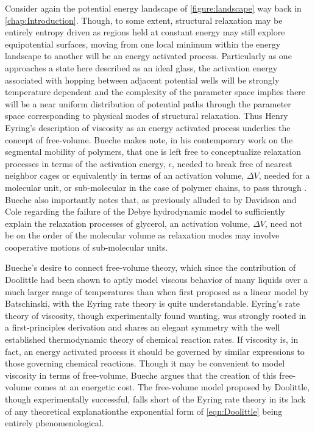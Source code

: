 Consider again the potential energy landscape of \fig \nolinebreak \ref{figure:landscape} way back in \chap\nolinebreak \ref{chap:Introduction}. Though, to some extent, structural relaxation may be entirely entropy driven as regions held at constant energy may still explore equipotential surfaces, moving from one local minimum within the energy landscape to another will be an energy activated process. Particularly as one approaches a state here described as an ideal glass, the activation energy associated with hopping between adjacent potential wells will be strongly temperature dependent and the complexity of the parameter space implies there will be a near uniform distribution of potential paths through the parameter space corresponding to physical modes of structural relaxation.  Thus Henry Eyring's description of viscosity as an energy activated process underlies the concept of free-volume.  Bueche makes note, in his contemporary work on the segmental mobility of polymers, that one is left free to conceptualize relaxation processes in terms of the activation energy, $\epsilon$, needed to break free of nearest neighbor cages or equivalently in terms of an activation volume, $\Delta V$, needed for a molecular unit, or sub-molecular in the case of polymer chains, to pass through \nolinebreak\cite{Bueche}.  Bueche also importantly notes that, as previously alluded to by Davidson and Cole regarding the failure of the Debye hydrodynamic model to sufficiently explain the relaxation processes of glycerol, an activation volume, $\Delta V$, need not be on the order of the molecular volume as relaxation modes may involve cooperative motions of sub-molecular units.  

Bueche's desire to connect free-volume theory, which since the contribution of Doolittle had been shown to aptly model viscous behavior of many liquids over a much larger range of temperatures than when first proposed as a linear model by Batschinski, with the Eyring rate theory is quite understandable.  Eyring's rate theory of viscosity, though experimentally found wanting, was strongly rooted in a first-principles derivation and shares an elegant symmetry with the well established thermodynamic theory of chemical reaction rates.  If viscosity is, in fact, an energy activated process it should be governed by similar expressions to those governing chemical reactions.  Though it may be convenient to model viscosity in terms of free-volume, Bueche argues that the creation of this free-volume comes at an energetic cost.  The free-volume model proposed by Doolittle, though experimentally successful, falls short of the Eyring rate theory in its lack of any theoretical explanation\textemdash the exponential form of \eqn\nolinebreak \ref{eqn:Doolittle} being entirely phenomenological.  

